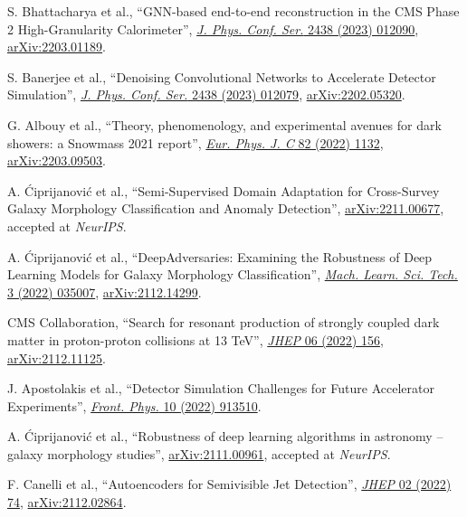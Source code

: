 \begin{description}[leftmargin=12pt,font=\normalfont,labelsep=0em]
\item S. Bhattacharya et al., ``GNN-based end-to-end reconstruction in the CMS Phase 2 High-Granularity Calorimeter'', \href{https://doi.org/10.1088/1742-6596/2438/1/012090}{\emph{J. Phys. Conf. Ser.} 2438 (2023) 012090}, \href{https://arxiv.org/abs/2203.01189}{arXiv:2203.01189}. %
\item S. Banerjee et al., ``Denoising Convolutional Networks to Accelerate Detector Simulation'', \href{https://doi.org/10.1088/1742-6596/2438/1/012079}{\emph{J. Phys. Conf. Ser.} 2438 (2023) 012079}, \href{https://arxiv.org/abs/2202.05320}{arXiv:2202.05320}. %
\item G. Albouy et al., ``Theory, phenomenology, and experimental avenues for dark showers: a Snowmass 2021 report'', \href{https://doi.org/10.1140/epjc/s10052-022-11048-8}{\emph{Eur. Phys. J. C} 82 (2022) 1132}, \href{https://arxiv.org/abs/2203.09503}{arXiv:2203.09503}. %
\ifdefined\longflag\item A. \'Ciprijanovi\'c et al., ``Semi-Supervised Domain Adaptation for Cross-Survey Galaxy Morphology Classification and Anomaly Detection'', \href{https://arxiv.org/abs/2211.00677}{arXiv:2211.00677}, accepted at \emph{NeurIPS}.\fi %
\item A. \'Ciprijanovi\'c et al., ``DeepAdversaries: Examining the Robustness of Deep Learning Models for Galaxy Morphology Classification'', \href{https://doi.org/10.1088/2632-2153/ac7f1a}{\emph{Mach. Learn. Sci. Tech.} 3 (2022) 035007}, \href{https://arxiv.org/abs/2112.14299}{arXiv:2112.14299}. %
\item CMS Collaboration, ``Search for resonant production of strongly coupled dark matter in proton-proton collisions at 13 TeV'', \href{https://doi.org/10.1007/JHEP06(2022)156}{\emph{JHEP} 06 (2022) 156}, \href{https://arxiv.org/abs/2112.11125}{arXiv:2112.11125}. %
\item J. Apostolakis et al., ``Detector Simulation Challenges for Future Accelerator Experiments'', \href{https://doi.org/10.3389/fphy.2022.913510}{\emph{Front. Phys.} 10 (2022) 913510}. %
\ifdefined\longflag\item A. \'Ciprijanovi\'c et al., ``Robustness of deep learning algorithms in astronomy -- galaxy morphology studies'', \href{https://arxiv.org/abs/2111.00961}{arXiv:2111.00961}, accepted at \emph{NeurIPS}. \fi %
\item F. Canelli et al., ``Autoencoders for Semivisible Jet Detection'', \href{https://doi.org/10.1007/JHEP02(2022)074}{\emph{JHEP} 02 (2022) 74}, \href{https://arxiv.org/abs/2112.02864}{arXiv:2112.02864}. %

\end{description}
